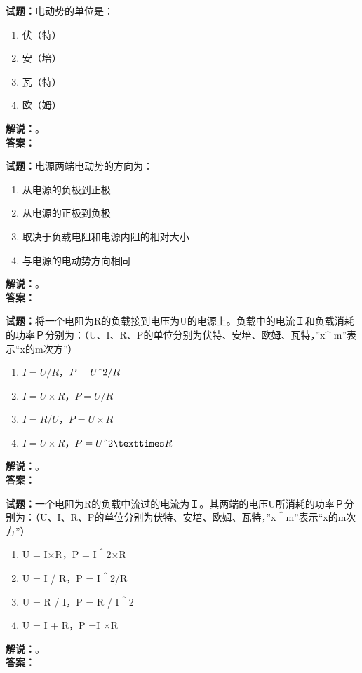 \documentclass{ctexbook}
\begin{document}
\vspace{\baselineskip}

\noindent\textbf{试题：}电动势的单位是：
\begin{enumerate}[leftmargin=3em]
  \item 伏（特）
  \item 安（培）
  \item 瓦（特）
  \item 欧（姆）
\end{enumerate}
\noindent\textbf{解说：}\textbf{}。\\\noindent\textbf{答案：}

\vspace{\baselineskip}

\noindent\textbf{试题：}电源两端电动势的方向为：
\begin{enumerate}[leftmargin=3em]
  \item 从电源的负极到正极
  \item 从电源的正极到负极
  \item 取决于负载电阻和电源内阻的相对大小
  \item 与电源的电动势方向相同
\end{enumerate}
\noindent\textbf{解说：}\textbf{}。\\\noindent\textbf{答案：}

\vspace{\baselineskip}

\noindent\textbf{试题：}将一个电阻为R的负载接到电压为U的电源上。负载中的电流Ｉ和负载消耗的功率Ｐ分别为：（U、I、R、P的单位分别为伏特、安培、欧姆、瓦特，”x\string^ m”表示“x的m次方”）
\begin{enumerate}[leftmargin=3em]
  \item \(I = U/R\)，\(P = U\string^ 2/R\)
  \item \(I = U\times R\)，\(P =U/R\)
  \item \(I = R/U\)，\(P = U\times R\)
  \item \(I = U\times R\)，\(P = U\string^ 2×R\)
\end{enumerate}
\noindent\textbf{解说：}\textbf{}。\\\noindent\textbf{答案：}

\vspace{\baselineskip}

\noindent\textbf{试题：}一个电阻为R的负载中流过的电流为Ｉ。其两端的电压U所消耗的功率Ｐ分别为：（U、I、R、P的单位分别为伏特、安培、欧姆、瓦特，”x＾m”表示“x的m次方”）
\begin{enumerate}[leftmargin=3em]
  \item U = I×R，P = I＾2×R
  \item U = I / R，P = I＾2/R
  \item U = R / I，P = R / I＾2
  \item U = I + R，P =I ×R
\end{enumerate}
\noindent\textbf{解说：}\textbf{}。\\\noindent\textbf{答案：}
\end{document}
